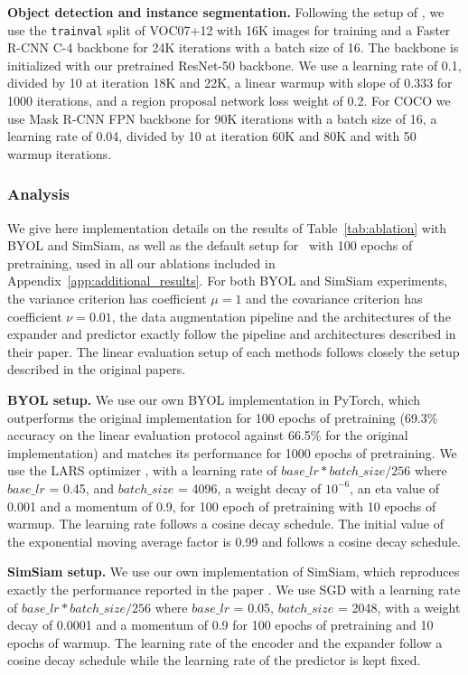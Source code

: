 \textbf{Object detection and instance segmentation.} Following the setup of \cite{he2020moco, zbontar2021barlow}, we use the \texttt{trainval} split of VOC07+12 with 16K images for training and a Faster R-CNN C-4 backbone for 24K iterations with a batch size of 16. The backbone is initialized with our pretrained ResNet-50 backbone. We use a learning rate of 0.1, divided by 10 at iteration 18K and 22K, a linear warmup with slope of 0.333 for 1000 iterations, and a region proposal network loss weight of 0.2. For COCO we use Mask R-CNN FPN backbone for 90K iterations with a batch size of 16, a learning rate of 0.04, divided by 10 at iteration 60K and 80K and with 50 warmup iterations.

\subsubsection{Analysis} \label{app:ablation}

We give here implementation details on the results of Table~\ref{tab:ablation} with BYOL and SimSiam, as well as the default setup for \algo \ with 100 epochs of pretraining, used in all our ablations included in Appendix~\ref{app:additional_results}. For both BYOL and SimSiam experiments, the variance criterion has coefficient $\mu=1$ and the covariance criterion has coefficient $\nu=0.01$, the data augmentation pipeline and the architectures of the expander and predictor exactly follow the pipeline and architectures described in their paper. The linear evaluation setup of each methods follows closely the setup described in the original papers.

\textbf{BYOL setup.} We use our own BYOL implementation in PyTorch, which outperforms the original implementation for 100 epochs of pretraining (69.3\% accuracy on the linear evaluation protocol against 66.5\% for the original implementation) and matches its performance for 1000 epochs of pretraining. We use the LARS optimizer \cite{you2017lars}, with a learning rate of $base\_lr * batch\_size / 256$ where $base\_lr$ = 0.45, and $batch\_size$ = 4096, a weight decay of $10^{-6}$, an eta value of 0.001 and a momentum of 0.9, for 100 epoch of pretraining with 10 epochs of warmup. The learning rate follows a cosine decay schedule. The initial value of the exponential moving average factor is 0.99 and follows a cosine decay schedule. 

\textbf{SimSiam setup.} We use our own implementation of SimSiam, which reproduces exactly the performance reported in the paper \cite{chen2020simsiam}. We use SGD with a learning rate of $base\_lr * batch\_size / 256$ where $base\_lr$ = 0.05, $batch\_size$ = 2048, with a weight decay of 0.0001 and a momentum of 0.9 for 100 epochs of pretraining and 10 epochs of warmup. The learning rate of the encoder and the expander follow a cosine decay schedule while the learning rate of the predictor is kept fixed.

